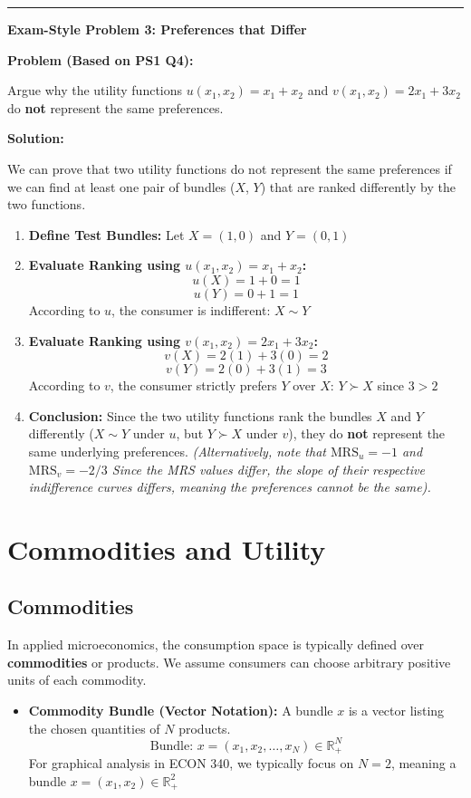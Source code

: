 \documentclass{article}
\begin{document}
\noindent\rule{\linewidth}{0.4pt}

\noindent\textbf{Exam-Style Problem 3: Preferences that Differ}

\textbf{Problem (Based on PS1 Q4):}

Argue why the utility functions $u(x_1, x_2) = x_1 + x_2$ and $v(x_1, x_2) = 2x_1 + 3x_2$ do \textbf{not} represent the same preferences.

\textbf{Solution:}

We can prove that two utility functions do not represent the same preferences if we can find at least one pair of bundles ($X$, $Y$) that are ranked differently by the two functions.

\begin{enumerate}
    \item \textbf{Define Test Bundles:} Let $X = (1, 0)$ and $Y = (0, 1)$
    \item \textbf{Evaluate Ranking using $u(x_1, x_2) = x_1 + x_2$:} \[u(X) = 1 + 0 = 1\] \[u(Y) = 0 + 1 = 1\] According to $u$, the consumer is indifferent: $X \sim Y$
    \item \textbf{Evaluate Ranking using $v(x_1, x_2) = 2x_1 + 3x_2$:} \[v(X) = 2(1) + 3(0) = 2\] \[v(Y) = 2(0) + 3(1) = 3\] According to $v$, the consumer strictly prefers $Y$ over $X$: $Y \succ X$ since $3 > 2$
    \item \textbf{Conclusion:} Since the two utility functions rank the bundles $X$ and $Y$ differently ($X \sim Y$ under $u$, but $Y \succ X$ under $v$), they do \textbf{not} represent the same underlying preferences. \textit{(Alternatively, note that $\text{MRS}_u = -1$ and $\text{MRS}_v = -2/3$ Since the MRS values differ, the slope of their respective indifference curves differs, meaning the preferences cannot be the same).}
\end{enumerate}
\pagebreak
\section{Commodities and Utility}
\subsection{Commodities}

In applied microeconomics, the consumption space is typically defined over \textbf{commodities} or products. We assume consumers can choose arbitrary positive units of each commodity.

\begin{itemize}
    \item \textbf{Commodity Bundle (Vector Notation):} A bundle $x$ is a vector listing the chosen quantities of $N$ products.
    $$\text{Bundle: } x = (x_1, x_2, \dots, x_N) \in \mathbb{R}^N_+$$
    For graphical analysis in ECON 340, we typically focus on $N=2$, meaning a bundle $x=(x_1, x_2) \in \mathbb{R}^2_+$
\end{itemize}
\end{document}
